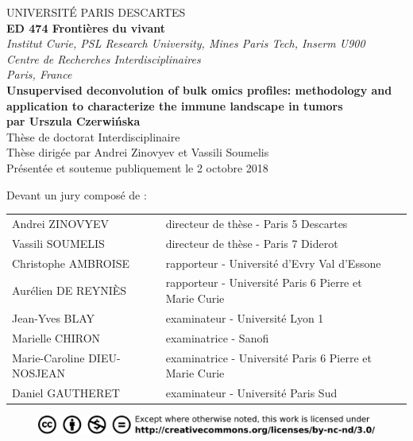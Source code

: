 \documentclass[12pt,]{book}
\theoremstyle{definition}
\theoremstyle{definition}
\theoremstyle{definition}
\theoremstyle{remark}
\begin{document}
\begin{titlepage}
\begin{center}
UNIVERSITÉ PARIS DESCARTES \\
\vspace*{0,5cm}
\textbf{ED 474 Frontières du vivant}\\
\vspace*{0,5cm}
\textit{Institut Curie, PSL Research University, Mines Paris Tech, Inserm U900 \\Centre de Recherches Interdisciplinaires\\Paris, France}\\
\vspace*{1cm}
\LARGE{\textbf{Unsupervised deconvolution of bulk omics profiles: methodology and application to characterize the immune landscape in tumors}}\\
\large{\textbf{par Urszula Czerwińska}}\\
\vspace*{0,5cm}
Thèse de doctorat Interdisciplinaire\\
\vspace*{0,5cm}
Thèse dirigée par Andrei Zinovyev et Vassili Soumelis\\
\vspace*{1cm}
\small{Présentée et soutenue publiquement le 2 octobre 2018}\\
\end{center}
\vspace*{0,2cm}
\begin{footnotesize}
Devant un jury composé de : \\
\begin{tabular}{lll}
Andrei ZINOVYEV & directeur de thèse - Paris 5 Descartes\\
Vassili SOUMELIS & directeur de thèse - Paris 7 Diderot\\
Christophe AMBROISE & rapporteur - Université d'Evry Val d'Essone\\
Aurélien DE REYNIÈS & rapporteur - Université Paris 6 Pierre et Marie Curie\\
Jean-Yves BLAY & examinateur - Université Lyon 1\\ 
Marielle CHIRON & examinatrice - Sanofi\\ 
Marie-Caroline DIEU-NOSJEAN & examinatrice - Université Paris 6 Pierre et Marie Curie\\ 
Daniel GAUTHERET & examinateur - Université Paris Sud\\ 
\end{tabular}
\end{footnotesize}

\begin{figure}[b]
\begin{center}
\includegraphics{figures-ext/creativecommons}
\end{center}
\end{figure}





\end{titlepage}
\end{document}

